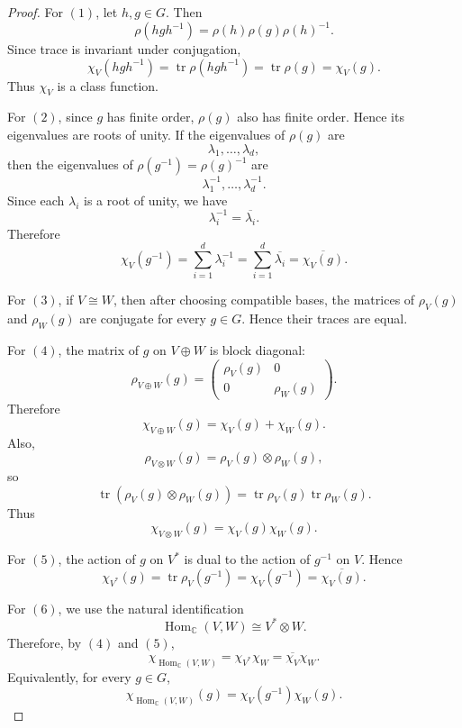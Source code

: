 \begin{proof}
    For \((1)\), let \(h,g\in G\). Then
    \[
        \rho(hgh^{-1})
        =
        \rho(h)\rho(g)\rho(h)^{-1}.
    \]
    Since trace is invariant under conjugation,
    \[
        \chi_V(hgh^{-1})
        =
        \operatorname{tr}\rho(hgh^{-1})
        =
        \operatorname{tr}\rho(g)
        =
        \chi_V(g).
    \]
    Thus \(\chi_V\) is a class function.

    For \((2)\), since \(g\) has finite order, \(\rho(g)\) also has finite order.
    Hence its eigenvalues are roots of unity. If the eigenvalues of \(\rho(g)\)
    are
    \[
        \lambda_1,\dots,\lambda_d,
    \]
    then the eigenvalues of \(\rho(g^{-1})=\rho(g)^{-1}\) are
    \[
        \lambda_1^{-1},\dots,\lambda_d^{-1}.
    \]
    Since each \(\lambda_i\) is a root of unity, we have
    \[
        \lambda_i^{-1}=\overline{\lambda_i}.
    \]
    Therefore
    \[
        \chi_V(g^{-1})
        =
        \sum_{i=1}^d\lambda_i^{-1}
        =
        \sum_{i=1}^d\overline{\lambda_i}
        =
        \overline{\chi_V(g)}.
    \]

    For \((3)\), if \(V\cong W\), then after choosing compatible bases, the matrices
    of \(\rho_V(g)\) and \(\rho_W(g)\) are conjugate for every \(g\in G\). Hence
    their traces are equal.

    For \((4)\), the matrix of \(g\) on \(V\oplus W\) is block diagonal:
    \[
        \rho_{V\oplus W}(g)
        =
        \begin{pmatrix}
            \rho_V(g) & 0         \\
            0         & \rho_W(g)
        \end{pmatrix}.
    \]
    Therefore
    \[
        \chi_{V\oplus W}(g)
        =
        \chi_V(g)+\chi_W(g).
    \]
    Also,
    \[
        \rho_{V\otimes W}(g)
        =
        \rho_V(g)\otimes \rho_W(g),
    \]
    so
    \[
        \operatorname{tr}(\rho_V(g)\otimes \rho_W(g))
        =
        \operatorname{tr}\rho_V(g)\operatorname{tr}\rho_W(g).
    \]
    Thus
    \[
        \chi_{V\otimes W}(g)=\chi_V(g)\chi_W(g).
    \]

    For \((5)\), the action of \(g\) on \(V^*\) is dual to the action of \(g^{-1}\)
    on \(V\). Hence
    \[
        \chi_{V^*}(g)
        =
        \operatorname{tr}\rho_V(g^{-1})
        =
        \chi_V(g^{-1})
        =
        \overline{\chi_V(g)}.
    \]

    For \((6)\), we use the natural identification
    \[
        \operatorname{Hom}_{\mathbb{C}}(V,W)
        \cong
        V^*\otimes W.
    \]
    Therefore, by \((4)\) and \((5)\),
    \[
        \chi_{\operatorname{Hom}_{\mathbb{C}}(V,W)}
        =
        \chi_{V^*}\chi_W
        =
        \overline{\chi_V}\chi_W.
    \]
    Equivalently, for every \(g\in G\),
    \[
        \chi_{\operatorname{Hom}_{\mathbb{C}}(V,W)}(g)
        =
        \chi_V(g^{-1})\chi_W(g).
    \]


\end{proof}

